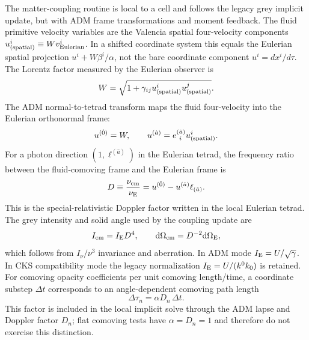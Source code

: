 \documentclass[11pt]{article}
\newcommand{\dd}{\mathrm{d}}
\newcommand{\nuE}{\nu_{\rm E}}
\newcommand{\nucm}{\nu_{\rm cm}}
\begin{document}
The matter-coupling routine is local to a cell and follows the legacy grey
implicit update, but with ADM frame transformations and moment feedback.  The
fluid primitive velocity variables are the Valencia spatial four-velocity
components \(u^i_{\rm(spatial)}\equiv Wv^i_{\rm Eulerian}\).  In a shifted
coordinate system this equals the Eulerian spatial projection
\(u^i+W\beta^i/\alpha\), not the bare coordinate component \(u^i=dx^i/d\tau\).
The Lorentz factor measured by the
Eulerian observer is
\begin{equation}
  W=\sqrt{1+\gamma_{ij}u^i_{\rm(spatial)}u^j_{\rm(spatial)}} .
\end{equation}
The ADM normal-to-tetrad transform maps the fluid four-velocity into the
Eulerian orthonormal frame:
\begin{equation}
  u^{(\hat0)}=W,\qquad
  u^{(\hat a)}=e^{(\hat a)}_{\ i}u^i_{\rm(spatial)} .
  \label{eq:fluid_tetrad_velocity}
\end{equation}
For a photon direction \((1,\ell^{(\hat a)})\) in the Eulerian tetrad, the
frequency ratio between the fluid-comoving frame and the Eulerian frame is
\begin{equation}
  D \equiv \frac{\nucm}{\nuE}
  =
  u^{(\hat0)}-u^{(\hat a)}\ell_{(\hat a)} .
  \label{eq:frequency_ratio}
\end{equation}
This is the special-relativistic Doppler factor written in the local Eulerian
tetrad.  The grey intensity and solid angle used by the coupling update are
\begin{equation}
  I_{\rm cm}=I_{\rm E}D^4,\qquad
  \dd\Omega_{\rm cm}=D^{-2}\dd\Omega_{\rm E},
  \label{eq:intensity_angle_transform}
\end{equation}
which follows from \(I_\nu/\nu^3\) invariance and aberration.  In ADM mode
\(I_{\rm E}=U/\sqrt{\gamma}\).  In CKS compatibility mode the legacy
normalization \(I_{\rm E}=U/(k^0k_0)\) is retained.
For comoving opacity coefficients per unit comoving length/time, a coordinate
substep \(\Delta t\) corresponds to an angle-dependent comoving path length
\begin{equation}
  \Delta \tau_n = \alpha D_n\,\Delta t .
  \label{eq:source_dtau}
\end{equation}
This factor is included in the local implicit solve through the ADM lapse and
Doppler factor \(D_n\); flat comoving tests have \(\alpha=D_n=1\) and therefore
do not exercise this distinction.
\end{document}
